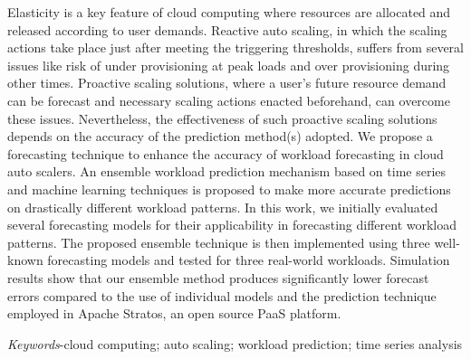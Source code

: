 Elasticity is a key feature of cloud computing where resources are allocated and released according to user demands. Reactive auto scaling, in which the scaling actions take place just after meeting the triggering thresholds, suffers from several issues like risk of under provisioning at peak loads and over provisioning during other times. Proactive scaling solutions, where a user's future resource demand can be forecast and necessary scaling actions enacted beforehand, can overcome these issues. Nevertheless, the effectiveness of such proactive scaling solutions depends on the accuracy of the prediction method(s) adopted. We propose a forecasting technique to enhance the accuracy of workload forecasting in cloud auto scalers. An ensemble workload prediction mechanism based on time series and machine learning techniques is proposed to make more accurate predictions on drastically different workload patterns. In this work, we initially evaluated several forecasting models for their applicability in forecasting different workload patterns. The proposed ensemble technique is then implemented using three well-known forecasting models and tested for three real-world workloads. Simulation results show that our ensemble method produces significantly lower forecast errors compared to the use of individual models and the prediction technique employed in Apache Stratos, an open source PaaS platform.

\textit{Keywords}-cloud computing; auto scaling; workload prediction; time series analysis